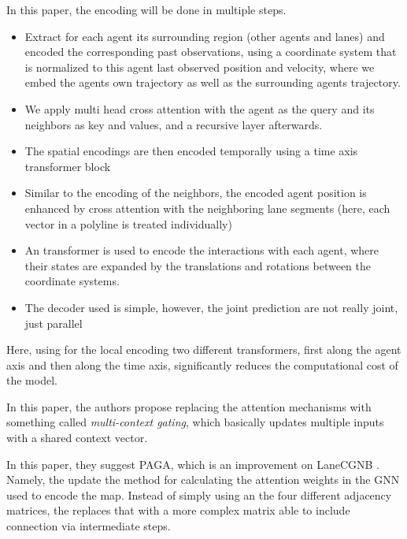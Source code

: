 
\cite{zhou2022hivt} In this paper, the encoding will be done in multiple steps. 
\begin{itemize}
    \item Extract for each agent its surrounding region (other agents and lanes) and encoded the corresponding past observations, using a coordinate system that is normalized to this agent last observed position and velocity, where we embed the agents own trajectory as well as the surrounding agents trajectory.
    \item We apply multi head cross attention with the agent as the query and its neighbors as key and values, and a recursive layer afterwards.
    \item The spatial encodings are then encoded temporally using a time axis transformer block
    \item Similar to the encoding of the neighbors, the encoded agent position is enhanced by cross attention with the neighboring lane segments (here, each vector in a polyline is treated individually)
    \item An transformer is used to encode the interactions with each agent, where their states are expanded by the translations and rotations between the coordinate systems.
    \item The decoder used is simple, however, the joint prediction are not really joint, just parallel
    
\end{itemize}
Here, using for the local encoding two different transformers, first along the agent axis and then along the time axis, significantly reduces the computational cost of the model.


\cite{varadarajan2022multipath} In this paper, the authors propose replacing the attention mechanisms with something called \textit{multi-context gating}, which basically updates multiple inputs with a shared context vector.



\cite{da2022path} In this paper, they suggest PAGA, which is an improvement on LaneCGNB \cite{liang2020learning}. Namely, the update the method for calculating the attention weights in the GNN used to encode the map. Instead of simply using an the four different adjacency matrices, the replaces that with a more complex matrix able to include connection via intermediate steps.

